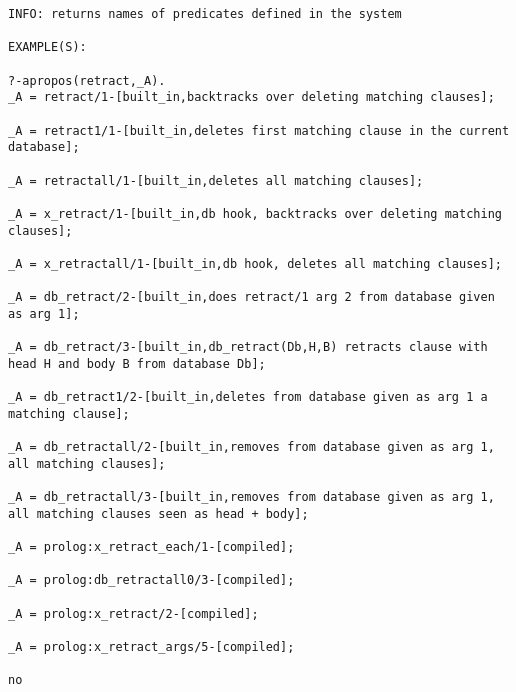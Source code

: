 {\small \begin{verbatim}
INFO: returns names of predicates defined in the system

EXAMPLE(S):

?-apropos(retract,_A).
_A = retract/1-[built_in,backtracks over deleting matching clauses];

_A = retract1/1-[built_in,deletes first matching clause in the current database];

_A = retractall/1-[built_in,deletes all matching clauses];

_A = x_retract/1-[built_in,db hook, backtracks over deleting matching clauses];

_A = x_retractall/1-[built_in,db hook, deletes all matching clauses];

_A = db_retract/2-[built_in,does retract/1 arg 2 from database given as arg 1];

_A = db_retract/3-[built_in,db_retract(Db,H,B) retracts clause with head H and body B from database Db];

_A = db_retract1/2-[built_in,deletes from database given as arg 1 a matching clause];

_A = db_retractall/2-[built_in,removes from database given as arg 1, all matching clauses];

_A = db_retractall/3-[built_in,removes from database given as arg 1, all matching clauses seen as head + body];

_A = prolog:x_retract_each/1-[compiled];

_A = prolog:db_retractall0/3-[compiled];

_A = prolog:x_retract/2-[compiled];

_A = prolog:x_retract_args/5-[compiled];

no

\end{verbatim}}
